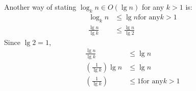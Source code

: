 Another way of stating $\log_k n \in O(\lg n)$ for any $k > 1$ is:
\begin{align*}
\log_k n &\leq \lg n \text{for any}  k > 1 \\
\frac{\lg n}{\lg k} &\leq \frac{\lg n}{\lg 2}
\end{align*}
Since $\lg 2 = 1$, \\
\begin{align*}
\frac{\lg n}{\lg k} &\leq \lg n \\ 
\left(\frac{1}{\lg k}\right)\lg n &\leq \lg n \\
\left(\frac{1}{\lg k}\right) &\leq 1 \text{for any} k > 1 \\
\end{align*}
